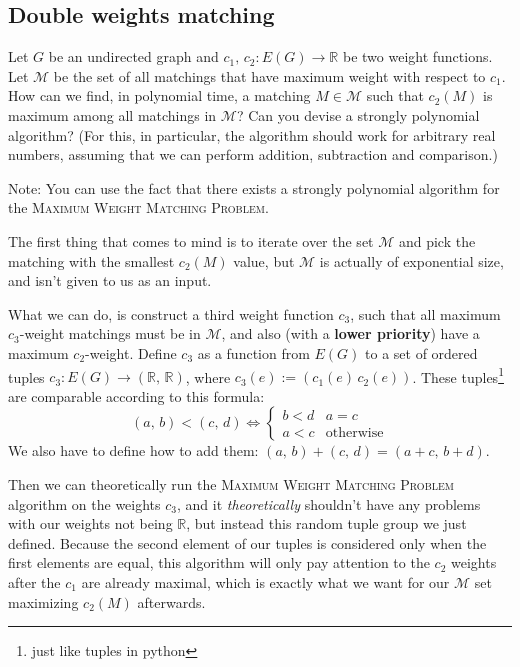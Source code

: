 \documentclass{article}
\newcommand{\R}{\mathbb{R}}
\begin{document}
  \subsection{Double weights matching}
  \begin{centerframebox}
    Let $G$ be an undirected graph and $c_1,\, c_2 : E(G) \to \R$ be two weight
    functions. Let $\mathcal{M}$ be the set of all matchings that have maximum weight with
    respect to $c_1$. How can we find, in polynomial time, a matching $M \in \mathcal{M}$ such
    that $c_2(M)$ is maximum among all matchings in $\mathcal{M}$? Can you devise a strongly
    polynomial algorithm?
    (For this, in particular, the algorithm should work for arbitrary real numbers,
    assuming that we can perform addition, subtraction and comparison.)

    Note: You can use the fact that there exists a strongly polynomial algorithm for
    the \textsc{Maximum Weight Matching Problem}.
  \end{centerframebox}
  The first thing that comes to mind is to iterate over the set $\mathcal{M}$ and pick the matching with the smallest $c_2(M)$ value,
  but $\mathcal{M}$ is actually of exponential size, and isn't given to us as an input.

  What we can do, is construct a third weight function $c_3$, such that all maximum $c_3$-weight matchings must be in $\mathcal{M}$,
  and also (with a \textbf{lower priority}) have a maximum $c_2$-weight.
  Define $c_3$ as a function from $E(G)$ to a set of ordered tuples $c_3 : E(G) \to (\R,\, \R)$, where $c_3(e) := (c_1(e)\, c_2(e))$.
  These tuples\footnote{just like tuples in python} are comparable according to this formula:
  \[ (a,\, b) < (c,\, d) \iff \begin{cases}
    b < d & a = c \\
    a < c & \textrm{otherwise}
  \end{cases} \]
  We also have to define how to add them: $(a,\, b) + (c,\, d) = (a+c,\, b+d)$.

  Then we can theoretically run the \textsc{Maximum Weight Matching Problem} algorithm on the weights $c_3$,
  and it \textit{theoretically} shouldn't have any problems with our weights not being $\R$,
  but instead this random tuple group we just defined.
  Because the second element of our tuples is considered only when the first elements are equal,
  this algorithm will only pay attention to the $c_2$ weights after the $c_1$ are already maximal,
  which is exactly what we want for our $\mathcal{M}$ set maximizing $c_2(M)$ afterwards.
\end{document}
